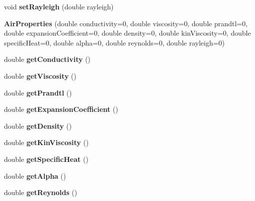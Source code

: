 \begin{DoxyCompactItemize}
void {\bfseries set\+Rayleigh} (double rayleigh)
\item 
\mbox{\label{class_air_properties_a36a493e8472cb77f5810bdb00f46b980}} 
{\bfseries Air\+Properties} (double conductivity=0, double viscosity=0, double prandtl=0, double expansion\+Coefficient=0, double density=0, double kin\+Viscosity=0, double specific\+Heat=0, double alpha=0, double reynolds=0, double rayleigh=0)
\item 
\mbox{\label{class_air_properties_aed3b8e1d195b141e569885563a7059af}} 
double {\bfseries get\+Conductivity} ()
\item 
\mbox{\label{class_air_properties_afa27468d7215771f5bb8a9181234d6c0}} 
double {\bfseries get\+Viscosity} ()
\item 
\mbox{\label{class_air_properties_a448c8ea703d1e1a5cf73e30df0b9de8d}} 
double {\bfseries get\+Prandtl} ()
\item 
\mbox{\label{class_air_properties_ac6ea04ab5c76c2f9fd4c387077171ecb}} 
double {\bfseries get\+Expansion\+Coefficient} ()
\item 
\mbox{\label{class_air_properties_a13b2414ef175c1235c6404ae0d569291}} 
double {\bfseries get\+Density} ()
\item 
\mbox{\label{class_air_properties_ae5b3a7528ee3f6465381bfafd31d9089}} 
double {\bfseries get\+Kin\+Viscosity} ()
\item 
\mbox{\label{class_air_properties_ae488433b1f70ddee59dd695196a70891}} 
double {\bfseries get\+Specific\+Heat} ()
\item 
\mbox{\label{class_air_properties_ae6b00fbabd5fca301a600c007eaf63e5}} 
double {\bfseries get\+Alpha} ()
\item 
\mbox{\label{class_air_properties_a65c391506fe0e8928bd9735936fc431b}} 
double {\bfseries get\+Reynolds} ()
\item 
\mbox{\label{class_air_properties_a93f0be70b3e396ae2f7f2dfd47d13c13}} 

\end{DoxyCompactItemize}
